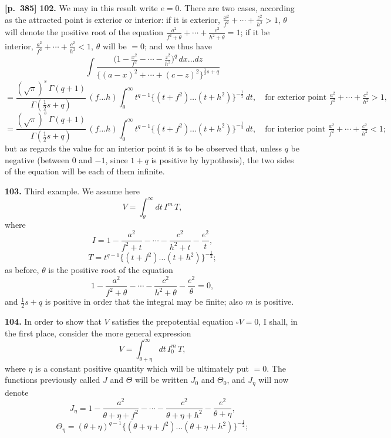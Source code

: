 \documentclass[11pt,a4paper]{article}
\begin{document}
\noindent\textbf{[p.~385]}\quad
\textbf{102.} We may in this result write $e = 0$. There are two cases, according as the attracted point is exterior or interior: if it is exterior, $\tfrac{x^{2}}{f^{2}} + \cdots + \tfrac{z^{2}}{h^{2}} > 1$, $\theta$ will denote the positive root of the equation $\tfrac{a^{2}}{f^{2}+\theta} + \cdots + \tfrac{c^{2}}{h^{2}+\theta} = 1$; if it be interior, $\tfrac{a^{2}}{f^{2}} + \cdots + \tfrac{c^{2}}{h^{2}} < 1$, $\theta$ will be $= 0$; and we thus have
\[
\int \frac{\bigl(1 - \tfrac{x^{2}}{f^{2}} - \cdots - \tfrac{z^{2}}{h^{2}}\bigr)^{q}\,dx\ldots dz}{\bigl\{(a-x)^{2} + \cdots + (c-z)^{2}\bigr\}^{\tfrac{1}{2}s + q}}
\]
\[
= \frac{(\sqrt{\pi})^{s}\,\Gamma(q+1)}{\Gamma(\tfrac{1}{2}s + q)}\,(f\ldots h)\int_{\theta}^{\infty} t^{q-1}\bigl\{(t+f^{2})\ldots(t+h^{2})\bigr\}^{-\tfrac{1}{2}}\,dt,
\quad\text{for exterior point } \tfrac{a^{2}}{f^{2}} + \cdots + \tfrac{c^{2}}{h^{2}} > 1,
\]
\[
= \frac{(\sqrt{\pi})^{s}\,\Gamma(q+1)}{\Gamma(\tfrac{1}{2}s + q)}\,(f\ldots h)\int_{0}^{\infty} t^{q-1}\bigl\{(t+f^{2})\ldots(t+h^{2})\bigr\}^{-\tfrac{1}{2}}\,dt,
\quad\text{for interior point } \tfrac{a^{2}}{f^{2}} + \cdots + \tfrac{c^{2}}{h^{2}} < 1;
\]
but as regards the value for an interior point it is to be observed that, unless $q$ be negative (between $0$ and $-1$, since $1 + q$ is positive by hypothesis), the two sides of the equation will be each of them infinite.

\textbf{103.} Third example. We assume here
\[
V = \int_{\theta}^{\infty} dt\, I^{m}\,T,
\]
where
\[
I = 1 - \frac{a^{2}}{f^{2}+t} - \cdots - \frac{c^{2}}{h^{2}+t} - \frac{e^{2}}{t},
\]
\[
T = t^{q-1}\bigl\{(t+f^{2})\ldots(t+h^{2})\bigr\}^{-\tfrac{1}{2}};
\]
as before, $\theta$ is the positive root of the equation
\[
1 - \frac{a^{2}}{f^{2}+\theta} - \cdots - \frac{c^{2}}{h^{2}+\theta} - \frac{e^{2}}{\theta} = 0,
\]
and $\tfrac{1}{2}s + q$ is positive in order that the integral may be finite; also $m$ is positive.

\textbf{104.} In order to show that $V$ satisfies the prepotential equation $\square V = 0$, I shall, in the first place, consider the more general expression
\[
V = \int_{\theta + \eta}^{\infty} dt\, I_{0}^{m}\,T,
\]
where $\eta$ is a constant positive quantity which will be ultimately put $= 0$. The functions previously called $J$ and $\Theta$ will be written $J_{0}$ and $\Theta_{0}$, and $J_{\eta}$ will now denote
\[
J_{\eta} = 1 - \frac{a^{2}}{\theta + \eta + f^{2}} - \cdots - \frac{c^{2}}{\theta + \eta + h^{2}} - \frac{e^{2}}{\theta + \eta},
\]
\[
\Theta_{\eta} = (\theta + \eta)^{q-1}\bigl\{(\theta + \eta + f^{2})\ldots(\theta + \eta + h^{2})\bigr\}^{-\tfrac{1}{2}};
\]
\end{document}
